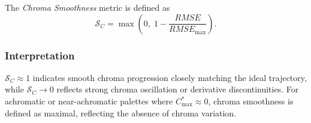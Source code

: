The \emph{Chroma Smoothness} metric is defined as
\begin{equation}
\mathcal{S}_C
=
\max\!\left(
0,\;
1 - \frac{RMSE}{RMSE_{\max}}
\right).
\end{equation}

\subsubsection{Interpretation}

$\mathcal{S}_C \approx 1$ indicates smooth chroma progression closely matching the ideal
trajectory, while $\mathcal{S}_C \to 0$ reflects strong chroma oscillation or derivative
discontinuities. For achromatic or near-achromatic palettes where $C^*_{\max} \approx 0$,
chroma smoothness is defined as maximal, reflecting the absence of chroma variation.
